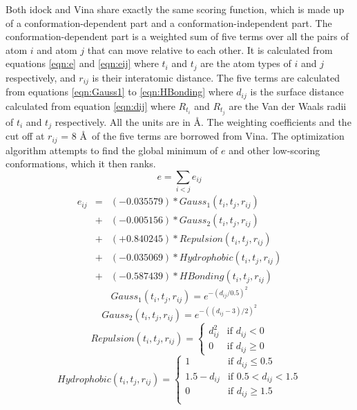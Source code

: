 \documentclass[10pt, conference, compsocconf]{IEEEtran}
\begin{document}
Both idock and Vina share exactly the same scoring function, which is made up of a conformation-dependent part and a conformation-independent part. The conformation-dependent part is a weighted sum of five terms over all the pairs of atom $i$ and atom $j$ that can move relative to each other. It is calculated from equations \eqref{eqn:e} and \eqref{eqn:eij} where $t_i$ and $t_j$ are the atom types of $i$ and $j$ respectively, and $r_{ij}$ is their interatomic distance. The five terms are calculated from equations \eqref{eqn:Gauss1} to \eqref{eqn:HBonding} where $d_{ij}$ is the surface distance calculated from equation \eqref{eqn:dij} where $R_{t_i}$ and $R_{t_j}$ are the Van der Waals radii of $t_i$ and $t_j$ respectively. All the units are in \AA. The weighting coefficients and the cut off at $r_{ij}$ = 8 \AA\ of the five terms are borrowed from Vina. The optimization algorithm attempts to find the global minimum of $e$ and other low-scoring conformations, which it then ranks.
\begin{equation}
\label{eqn:e}
e = \sum_{i < j} e_{ij}
\end{equation}
\begin{eqnarray}
\label{eqn:eij}
e_{ij} &=& (-0.035579) * Gauss_1(t_i, t_j, r_{ij}) \nonumber \\
       &+& (-0.005156) * Gauss_2(t_i, t_j, r_{ij}) \nonumber \\
       &+& (+0.840245) * Repulsion(t_i, t_j, r_{ij}) \nonumber \\
       &+& (-0.035069) * Hydrophobic(t_i, t_j, r_{ij}) \nonumber \\
       &+& (-0.587439) * HBonding(t_i, t_j, r_{ij})
\end{eqnarray}
\begin{equation}
\label{eqn:Gauss1}
Gauss_1(t_i, t_j, r_{ij}) = e^{-(d_{ij} / 0.5)^2}
\end{equation}
\begin{equation}
\label{eqn:Gauss2}
Gauss_2(t_i, t_j, r_{ij}) = e^{-((d_{ij} - 3) / 2)^2}
\end{equation}
\begin{equation}
\label{eqn:Repulsion}
Repulsion(t_i, t_j, r_{ij}) =
\begin{cases}
d_{ij}^2 & \text{if } d_{ij} < 0\\
0 &\text{if } d_{ij} \geq 0
\end{cases}
\end{equation}
\begin{equation}
\label{eqn:Hydrophobic}
Hydrophobic(t_i, t_j, r_{ij}) =
\begin{cases}
1 & \text{if } d_{ij} \leq 0.5\\
1.5 - d_{ij} & \text{if } 0.5 < d_{ij} < 1.5\\
0 & \text{if } d_{ij} \geq 1.5\\
\end{cases}
\end{equation}
\end{document}
